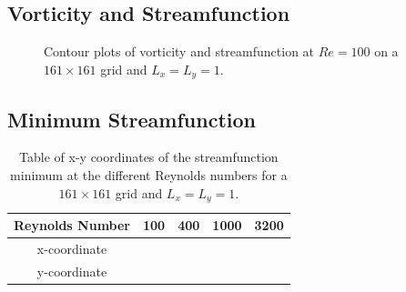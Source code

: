 \documentclass[11pt]{article}
\begin{document}
	\subsection{Vorticity and Streamfunction}
	\begin{figure}[htp]
            \centering
            \hfill
            \caption{Contour plots of vorticity and streamfunction at $Re=100$ on a $161 \times 161$ grid and $L_x = L_y = 1$.}
            \label{fig:contours}
        \end{figure}			
	
	\newpage
	\subsection{Minimum Streamfunction}
	\begin{table}[htb]
    	\centering
    	\begin{tabular}{ c | c c c c }
    	\toprule
    	Reynolds Number & 100 & 400 & 1000 & 3200 \\
    	\midrule
		x-coordinate &  &  &  &  \\
		y-coordinate &  &  &  &  \\
        \bottomrule
        \end{tabular}
        \vspace{0.5em}
        \label{tab:stress}
    	\caption{Table of x-y coordinates of the streamfunction minimum at the different Reynolds numbers for a $161 \times 161$ grid and $L_x = L_y = 1$.}	
	\end{table}
	
\end{document}
